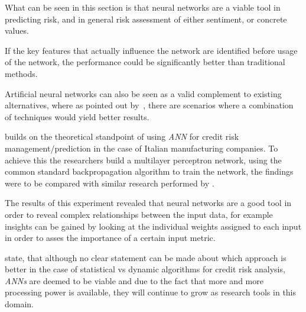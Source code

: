 \documentclass[12pt]{article}
\begin{document}
What can be seen in this section is that neural networks are a viable tool in predicting risk, and in general risk assessment of either sentiment, or concrete values. 

If the key features that actually influence the network are identified before usage of the network, the performance could be significantly better than traditional methods. 

Artificial neural networks can also be seen as a valid complement to existing alternatives, where as pointed out by~\citep{14_1_3.pdf}, there are scenarios where a combination of techniques would yield better results.

\citet{JILSA20111} builds on the theoretical standpoint of using \emph{ANN} for credit risk management/prediction in the case of Italian manufacturing companies. To achieve this the researchers build a multilayer perceptron network, using the common standard backpropagation algorithm to train the network, the findings were to be compared with similar research performed by \citep{anathema}. 

The results of this experiment revealed that neural networks are a good tool in order to reveal complex relationships between the input data, for example insights can be gained by looking at the individual weights assigned to each input in order to asses the importance of a certain input metric.

\cite{JILSA20111} state, that although no clear statement can be made about which approach is better in the case of statistical vs dynamic algorithms for credit risk analysis, \emph{ANNs} are deemed to be viable and due to the fact that more and more processing power is available, they will continue to grow as research tools in this domain.
\end{document}

